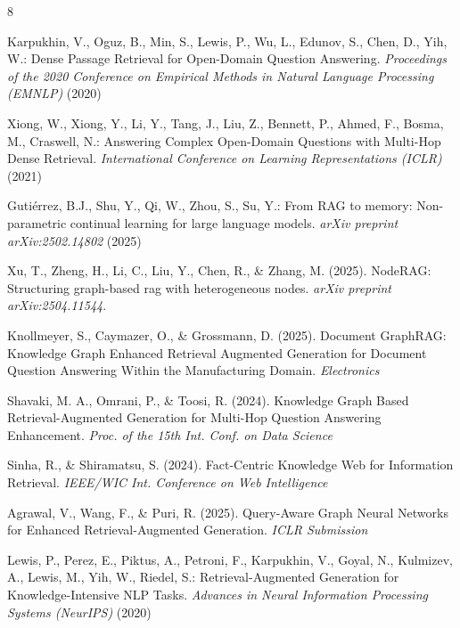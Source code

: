 \documentclass[runningheads]{llncs}
\begin{document}
%
%
%
% 
% 
%
\begin{thebibliography}{8}

Karpukhin, V., Oguz, B., Min, S., Lewis, P., Wu, L., Edunov, S., Chen, D., Yih, W.:
Dense Passage Retrieval for Open-Domain Question Answering.
\textit{Proceedings of the 2020 Conference on Empirical Methods in Natural Language Processing (EMNLP)} (2020)

Xiong, W., Xiong, Y., Li, Y., Tang, J., Liu, Z., Bennett, P., Ahmed, F., Bosma, M., Craswell, N.:
Answering Complex Open-Domain Questions with Multi-Hop Dense Retrieval.
\textit{International Conference on Learning Representations (ICLR)} (2021)

Guti{\'e}rrez, B.J., Shu, Y., Qi, W., Zhou, S., Su, Y.:
From RAG to memory: Non-parametric continual learning for large language models.
\textit{arXiv preprint arXiv:2502.14802} (2025)

Xu, T., Zheng, H., Li, C., Liu, Y., Chen, R., \& Zhang, M. (2025). NodeRAG: Structuring graph-based rag with heterogeneous nodes. \textit{arXiv preprint arXiv:2504.11544}.

Knollmeyer, S., Caymazer, O., \& Grossmann, D. (2025). Document GraphRAG: Knowledge Graph Enhanced Retrieval Augmented Generation for Document Question Answering Within the Manufacturing Domain. \textit{Electronics}

Shavaki, M. A., Omrani, P., \& Toosi, R. (2024). Knowledge Graph Based Retrieval-Augmented Generation for Multi-Hop Question Answering Enhancement. \textit{Proc. of the 15th Int. Conf. on Data Science}

Sinha, R., \& Shiramatsu, S. (2024). Fact-Centric Knowledge Web for Information Retrieval. \textit{IEEE/WIC Int. Conference on Web Intelligence}

Agrawal, V., Wang, F., \& Puri, R. (2025). Query-Aware Graph Neural Networks for Enhanced Retrieval-Augmented Generation. \textit{ICLR Submission}

Lewis, P., Perez, E., Piktus, A., Petroni, F., Karpukhin, V., Goyal, N., Kulmizev, A., Lewis, M., Yih, W., Riedel, S.: Retrieval-Augmented Generation for Knowledge-Intensive NLP Tasks.
\textit{Advances in Neural Information Processing Systems (NeurIPS)} (2020)


\end{thebibliography}
\end{document}

